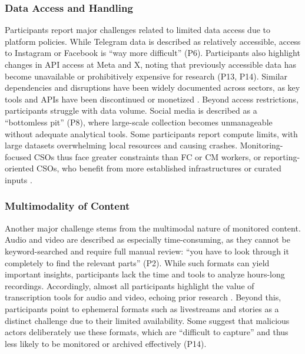 \documentclass[acmsmall]{acmart}
\begin{document}
\subsubsection{Data Access and Handling}
\label{sssec:data_access_handling}
Participants report major challenges related to limited data access due to platform policies. While Telegram data is described as relatively accessible, access to Instagram or Facebook is ``way more difficult'' (P6). Participants also highlight changes in API access at Meta and X, noting that previously accessible data has become unavailable or prohibitively expensive for research (P13, P14). Similar dependencies and disruptions have been widely documented across sectors, as key tools and APIs have been discontinued or monetized \cite{baumler_harnessing_2025,hancock_seeing_2024,hrckova_autonomation_2024,juneja_human_2022,nordis_report_2022,beers_examining_2020}.
Beyond access restrictions, participants struggle with data volume. Social media is described as a ``bottomless pit'' (P8), where large-scale collection becomes unmanageable without adequate analytical tools. Some participants report compute limits, with large datasets overwhelming local resources and causing crashes. Monitoring-focused CSOs thus face greater constraints than FC or CM workers, or reporting-oriented CSOs, who benefit from more established infrastructures or curated inputs \cite{juneja_human_2022,hrckova_autonomation_2024,belair-gagnon_knowledge_2023,baumler_harnessing_2025}.


\subsubsection{Multimodality of Content}
\label{sssec:challenge_multimodal}
Another major challenge stems from the multimodal nature of monitored content. Audio and video are described as especially time-consuming, as they cannot be keyword-searched and require full manual review: ``you have to look through it completely to find the relevant parts'' (P2). While such formats can yield important insights, participants lack the time and tools to analyze hours-long recordings.
Accordingly, almost all participants highlight the value of transcription tools for audio and video, echoing prior research \cite{cifliku_save_2025,juneja_human_2022,liu_human-centered_2024}. Beyond this, participants point to ephemeral formats such as livestreams and stories as a distinct challenge due to their limited availability. Some suggest that malicious actors deliberately use these formats, which are ``difficult to capture'' and thus less likely to be monitored or archived effectively (P14).
\end{document}
